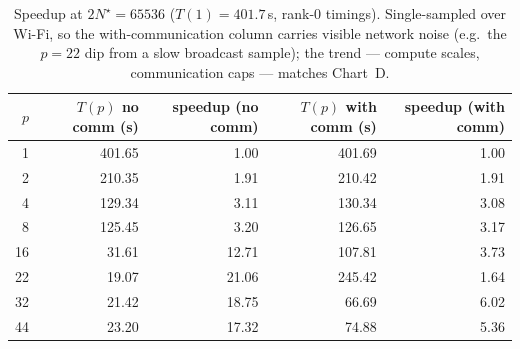 \documentclass[11pt,a4paper]{article}
\begin{document}
\begin{table}[H]
\centering\small
\caption{Speedup at $2N^{\star}=65536$ ($T(1)=401.7$\,s, rank-0 timings).
Single-sampled over Wi-Fi, so the with-communication column carries visible
network noise (e.g.\ the $p=22$ dip from a slow broadcast sample); the trend ---
compute scales, communication caps --- matches Chart~D.}\label{tab:2n}
\begin{tabular}{@{}rrrrr@{}}
\toprule
$p$ & $T(p)$ no comm (s) & speedup (no comm) & $T(p)$ with comm (s) & speedup (with comm) \\
\midrule
1  & 401.65 & 1.00  & 401.69 & 1.00 \\
2  & 210.35 & 1.91  & 210.42 & 1.91 \\
4  & 129.34 & 3.11  & 130.34 & 3.08 \\
8  & 125.45 & 3.20  & 126.65 & 3.17 \\
16 & 31.61  & 12.71 & 107.81 & 3.73 \\
22 & 19.07  & 21.06 & 245.42 & 1.64 \\
32 & 21.42  & 18.75 & 66.69  & 6.02 \\
44 & 23.20  & 17.32 & 74.88  & 5.36 \\
\bottomrule
\end{tabular}
\end{table}
\end{document}

